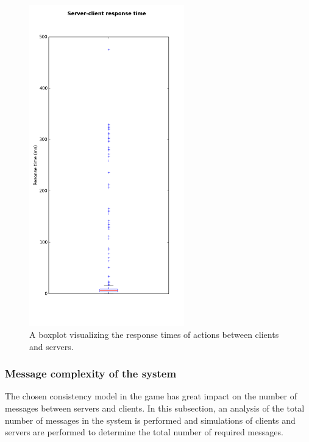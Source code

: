 		\begin{figure}[h!]
		  \centering
		    \includegraphics[width=0.6\textwidth, height=0.59\textheight]{images/boxplot_response_times}
		    
		  \caption{A boxplot visualizing the response times of actions between clients and servers.}
		  \label{fig:boxplot_response_times}
		\end{figure}
		
	\subsubsection{Message complexity of the system}
	\label{subsubsec:nummessages}
		The chosen consistency model in the game has great impact on the number of messages between servers and clients. 
		In this subsection, an analysis of the total number of messages in the system is performed and simulations of clients and servers are performed to determine the total number of required messages.\\
		
		

